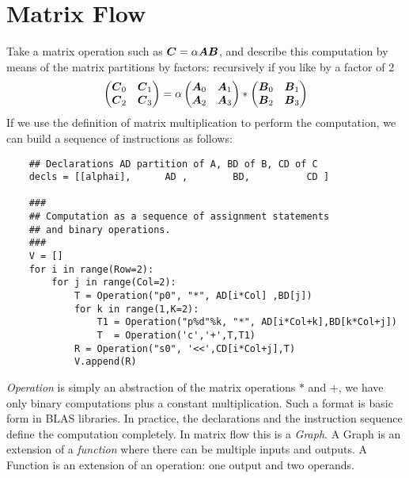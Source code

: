 \documentclass[acmsmall]{acmart}
\begin{document}
\section{Matrix Flow}
\label{sec:matrixflow}

Take a matrix operation such as ${\boldsymbol C} = \alpha {\boldsymbol A}{\boldsymbol B}$, and
describe this computation by means of the matrix partitions by
factors: recursively if you like by a factor of 2
\begin{equation}
  \label{basic_2}
  \begin{pmatrix}
    {\boldsymbol C}_0 & {\boldsymbol C}_1 \\
    {\boldsymbol C}_2 & {\boldsymbol C}_3 \\
  \end{pmatrix} = \alpha
  \begin{pmatrix}
    {\boldsymbol A}_0 & {\boldsymbol A}_1 \\
    {\boldsymbol A}_2 & {\boldsymbol A}_3 \\
  \end{pmatrix} *
  \begin{pmatrix}
    {\boldsymbol B}_0 & {\boldsymbol B}_1 \\
    {\boldsymbol B}_2 & {\boldsymbol B}_3 \\
  \end{pmatrix} 
\end{equation}
If we use the definition of matrix multiplication to perform the
computation, we can build a sequence of instructions as follows:
\begin{verbatim}
    ## Declarations AD partition of A, BD of B, CD of C 
    decls = [[alphai],      AD ,        BD,          CD ]     

    ###
    ## Computation as a sequence of assignment statements
    ## and binary operations.  
    ###
    V = []
    for i in range(Row=2):
        for j in range(Col=2):
            T = Operation("p0", "*", AD[i*Col] ,BD[j])
            for k in range(1,K=2):
                T1 = Operation("p%d"%k, "*", AD[i*Col+k],BD[k*Col+j])
                T  = Operation('c','+',T,T1)
            R = Operation("s0", '<<',CD[i*Col+j],T)
            V.append(R)
\end{verbatim}
{\em Operation} is simply an abstraction of the matrix operations $*$
and $+$, we have only binary computations plus a constant
multiplication. Such a format is basic form in BLAS libraries. In
practice, the declarations and the instruction sequence define the
computation completely. In matrix flow this is a {\em Graph}. A Graph
is an extension of a {\em function} where there can be multiple inputs
and outputs. A Function is an extension of an operation: one output
and two operands.
\end{document}
